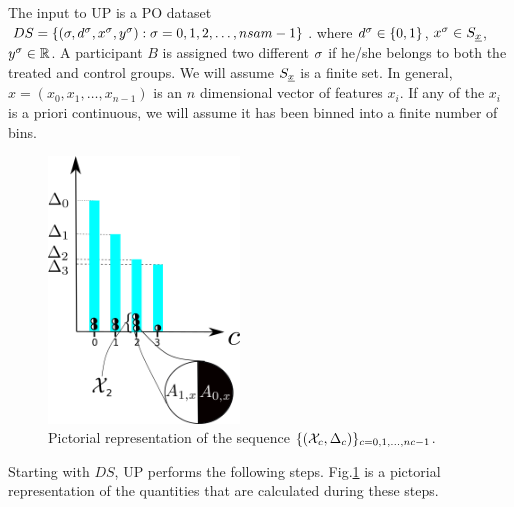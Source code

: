 The input
to UP is a PO
dataset $DS= \{ (\sigma, d^\sigma, x^\sigma, y^\sigma):
 \sigma=0, 1, 2, \ldots, nsam-1\}$.
where $d^\sigma\in \{0,1\}$, $x^\sigma \in S_{\underline{x}}$,
$y^\sigma\in { \mathbb{R}}$.
A  participant $B$
is assigned two different
$\sigma$
if he/she
belongs to
both the treated and control groups.
We will assume 
$S_{\underline{x}}$ is a finite set.
In general,
$x=(x_0, x_1,\dots, x_{n-1})$ is an $n$ dimensional 
vector of features $x_i$.
If any of the $x_i$
is a priori continuous, we will
assume it has  been binned into
a finite number of bins.

\begin{figure}[h!]
\centering
\includegraphics[width=2in]
{uplift/uplift-bins.png}
\caption{
Pictorial
representation
of the sequence
$\{({\cal X}_c, \Delta_c)\}_{c=0, 1, \ldots, nc-1}$.
}
\label{fig-uplift-bins}
\end{figure}


Starting with $DS$,
UP performs the following steps.
Fig.\ref{fig-uplift-bins}
is a pictorial representation
of the quantities
that are calculated
during these steps.

